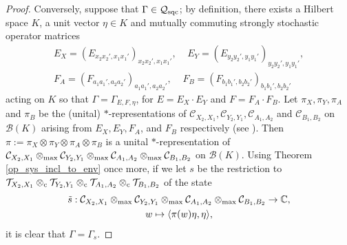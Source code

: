 \documentclass[11pt]{amsart}
\newcommand{\cl}[1]{\mathcal{#1}}
\newcommand{\bb}[1]{\mathbb{#1}}
\begin{document}
\begin{proof}
Conversely, suppose that $\Gamma \in \cl{Q}_{\rm sqc}$; by definition, there exists a Hilbert space $K$, a unit vector $\eta \in K$ and mutually commuting strongly stochastic operator matrices
\begin{gather*}
	E_{X} = (E_{x_{2}x_{2}', x_{1}x_{1}'})_{x_{2}x_{2}', x_{1}x_{1}'}, \;\;\;\; E_{Y} = (E_{y_{2}y_{2}', y_{1}y_{1}'})_{y_{2}y_{2}', y_{1}y_{1}'}, 
\\	F_{A} = (F_{a_{1}a_{1}', a_{2}a_{2}'})_{a_{1}a_{1}', a_{2}a_{2}'}, \;\;\;\; F_{B} = (F_{b_{1}b_{1}', b_{2}b_{2}'})_{b_{1}b_{1}', b_{2}b_{2}'}
\end{gather*}
\noindent acting on $K$ so that $\Gamma = \Gamma_{E, F, \eta}$, for $E = E_{X}\cdot E_{Y}$ and $F = F_{A} \cdot F_{B}$. Let $\pi_{X}, \pi_{Y}, \pi_{A}$ and $\pi_{B}$ be the (unital) $*$-representations of $\cl{C}_{X_{2}, X_{1}}, \cl{C}_{Y_{2}, Y_{1}}, \cl{C}_{A_{1}, A_{2}}$ and $\cl{C}_{B_{1}, B_{2}}$ on $\cl{B}(K)$ arising from $E_{X}, E_{Y}, F_{A}$, and $F_{B}$ respectively (see \cite[Theorem 5.2]{tt}). Then $\pi := \pi_{X}\otimes \pi_{Y}\otimes \pi_{A}\otimes \pi_{B}$ is a unital $*$-representation of $\cl{C}_{X_{2}, X_{1}}\otimes_{\rm max} \cl{C}_{Y_{2}, Y_{1}}\otimes_{\rm max} \cl{C}_{A_{1}, A_{2}}\otimes_{\rm max} \cl{C}_{B_{1}, B_{2}}$ on $\cl{B}(K)$. Using Theorem \ref{op_sys_incl_to_env} once more, if we let $s$ be the restriction to $\cl{T}_{X_{2}, X_{1}}\otimes_{\rm c}\cl{T}_{Y_{2}, Y_{1}}\otimes_{\rm c} \cl{T}_{A_{1}, A_{2}}\otimes_{\rm c} \cl{T}_{B_{1}, B_{2}}$ of the state
\begin{gather*}
	\tilde{s}: \cl{C}_{X_{2}, X_{1}}\otimes_{\rm max} \cl{C}_{Y_{2}, Y_{1}}\otimes_{\rm max} \cl{C}_{A_{1}, A_{2}}\otimes_{\rm max} \cl{C}_{B_{1}, B_{2}} \rightarrow \bb{C}, 
\\ 	w \mapsto \langle \pi(w)\eta, \eta\rangle,
\end{gather*}
\noindent it is clear that $\Gamma = \Gamma_{s}$. 


\end{proof}
\end{document}
